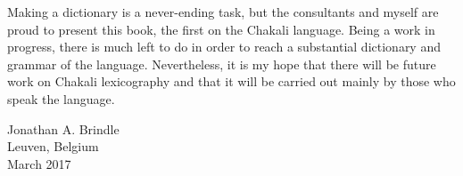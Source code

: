 \newpage 
Making a dictionary is a never-ending task, but the consultants and myself are  proud to present this book, the first on the Chakali language. Being a work  in  progress, there is much left to do in order to reach a substantial dictionary and grammar of the language.  Nevertheless, it is my hope that there will be  future work on Chakali lexicography  and that it will be carried out mainly  by those who speak the language. 

\begin{flushright}
 Jonathan A. Brindle\\ 
 Leuven, Belgium\\
March 2017\\

 \end{flushright}


\thispagestyle{plain}

